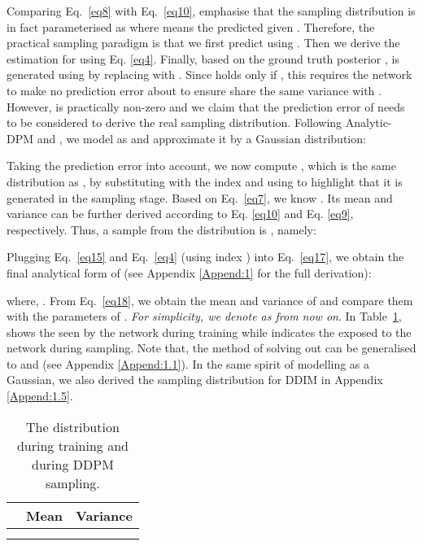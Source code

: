 \documentclass{article} \usepackage{iclr2024_conference,times}
\begin{document}
Comparing Eq.~\ref{eq8} with Eq.~\ref{eq10}, \citet{DDIM} emphasise that the sampling distribution  is in fact parameterised as  where  means the predicted  given . Therefore, the practical sampling paradigm is that we first predict  using . Then we derive the estimation  for  using Eq. \ref{eq4}. Finally, based on the ground truth posterior ,  is generated using  by replacing  with . 
Since  holds only if , this requires the network to make no prediction error about  to ensure  share the same variance with . However,  is practically non-zero and we claim that the prediction error of  needs to be considered to derive the real sampling distribution. Following Analytic-DPM  \citep{bao2022analytic} and \citet{bao2022estimating}, we model  as  and approximate it by a Gaussian distribution:




\noindent
Taking the prediction error into account, we now compute , which is the same distribution as , by substituting with the index  and using  to highlight that it is generated in the sampling stage. Based on Eq.~\ref{eq7}, we know . Its mean and variance can be further derived according to Eq. \ref{eq10} and Eq. \ref{eq9}, respectively. Thus, a sample from the distribution is , namely:


\noindent
Plugging Eq.~\ref{eq15} and Eq.~\ref{eq4} (using index  ) into Eq.~\ref{eq17}, we obtain the final analytical form of  (see Appendix \ref{Append:1} for the full derivation):
\noindent


\noindent
where, . From Eq.~\ref{eq18}, we obtain the mean and variance of  and compare them with the parameters of . \textit{For simplicity, we denote  as  from now on}. In Table~\ref{tab: sampling distribution},  shows the  seen by the network during training while  indicates the  exposed to the network during sampling. Note that, the method of solving out  can be generalised to  and  (see Appendix \ref{Append:1.1}). In the same spirit of modelling  as a Gaussian, we also derived the sampling distribution  for DDIM \citep{DDIM} in Appendix \ref{Append:1.5}. 

\begin{table}[ht]
\vskip -0.1in
\captionsetup{skip=2pt}
\caption{
The distribution  during training and  during DDPM sampling.}
\label{tab: sampling distribution}
\begin{center}
\begin{tabular}{@{}lll@{}}
\toprule
 & Mean & Variance \\ \midrule
 &  &  \\
  &  &  \\ \bottomrule
\end{tabular}
\end{center}
\vskip -0.2in
\end{table}
\end{document}
